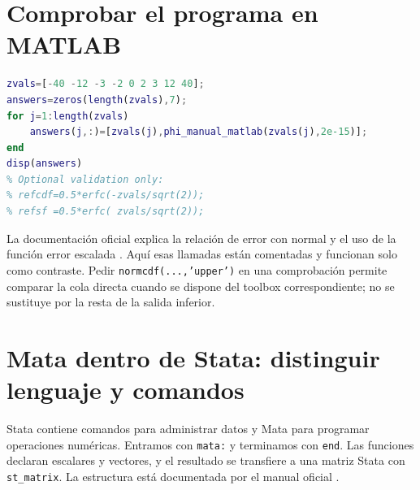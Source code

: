 \documentclass[11pt,a4paper]{article}
\theoremstyle{definition}
\begin{document}
\section{Comprobar el programa en MATLAB}
\begin{lstlisting}[language=Matlab]
zvals=[-40 -12 -3 -2 0 2 3 12 40];
answers=zeros(length(zvals),7);
for j=1:length(zvals)
    answers(j,:)=[zvals(j),phi_manual_matlab(zvals(j),2e-15)];
end
disp(answers)
% Optional validation only:
% refcdf=0.5*erfc(-zvals/sqrt(2));
% refsf =0.5*erfc( zvals/sqrt(2));
\end{lstlisting}
La documentación oficial explica la relación de error con normal y el uso de la función error escalada \cite{matlabactual}. Aquí esas llamadas están comentadas y funcionan solo como contraste. Pedir \texttt{normcdf(...,'upper')} en una comprobación permite comparar la cola directa cuando se dispone del toolbox correspondiente; no se sustituye por la resta de la salida inferior.

\section{Mata dentro de Stata: distinguir lenguaje y comandos}
Stata contiene comandos para administrar datos y Mata para programar operaciones numéricas. Entramos con \texttt{mata:} y terminamos con \texttt{end}. Las funciones declaran escalares y vectores, y el resultado se transfiere a una matriz Stata con \texttt{st\_matrix}. La estructura está documentada por el manual oficial \cite{mataactual}.
\end{document}
